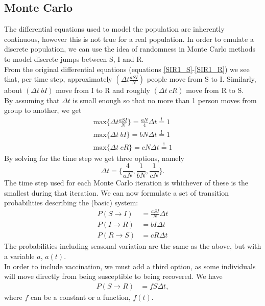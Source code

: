 \documentclass[notitlepage, reprint, nofootinbib]{revtex4-1}
\begin{document}
\subsection{Monte Carlo}
The differential equations used to model the population are inherently continuous, however this is not true for a real population. 
In order to emulate a discrete population, we can use the idea of randomness in Monte Carlo methods to model discrete jumps between S, I and R. \\[2mm] 
From the original differential equations (equations \ref{SIR1_S}-\ref{SIR1_R}) we see that, per time step, approximately $(\Delta t\frac{aSI}{N})$ people move from S to I. Similarly, about $(\Delta t\ bI)$ move from I to R and roughly $(\Delta t\ cR)$ move from R to S.\\[2mm]
By assuming that $\Delta t$ is small enough so that no more than 1 person moves from group to another, we get  
\begin{align}
	\text{max}\Big\{\Delta t\frac{aSI}{N}\Big\}=\frac{aN}{4}\Delta t\overset{!}{=}1\\
	\text{max}\Big\{\Delta t\ bI\Big\}=bN\Delta t\overset{!}{=}1\\
	\text{max}\Big\{\Delta t\ cR\Big\}=cN\Delta t\overset{!}{=}1
\end{align}
By solving for the time step we get three options, namely
\begin{equation}\label{time_steps}\Delta t=\Big\{\frac{4}{aN},\frac{1}{bN},\frac{1}{cN}\Big\}.\end{equation}
The time step used for each Monte Carlo iteration is whichever of these is the smallest during that iteration. We can now formulate a set of transition probabilities describing the (basic) system:
\begin{align}
	P(S\rightarrow I)&=\frac{aSI}{N}\Delta t\label{prob1}\\
	P(I\rightarrow R)&=bI\Delta t\\
	P(R\rightarrow S) &= cR\Delta t
\end{align}
The probabilities including seasonal variation are the same as the above, but with a variable $a$, $a(t)$.\\[2mm]
In order to include vaccination, we must add a third option, as some individuals will move directly from being susceptible to being recovered. We have
\begin{align}
	P(S\rightarrow R)&=fS\Delta t\label{prob2},
\end{align}
where $f$ can be a constant or a function, $f(t)$.\\[2mm]
\end{document}
